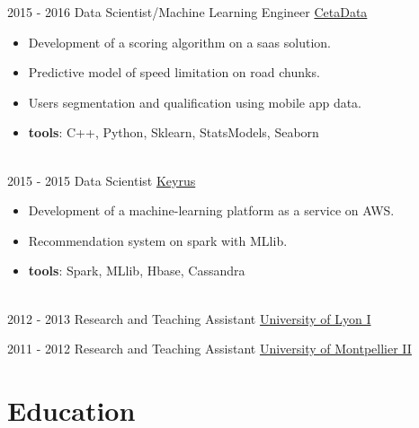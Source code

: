 \documentclass[letterpaper]{twentysecondcv} %
\begin{document}
\begin{twenty}
    \twentyitem
   		{2015 - 2016}
		{}
        {Data Scientist/Machine Learning Engineer}
        {\href{http://www.cetadata.com/}{CetaData}}
        {}
        {\vspace{-2mm}\begin{itemize}[topsep=0pt,partopsep=0pt]
				\item Development of a scoring algorithm on a saas solution.
        \item Predictive model of speed limitation on road chunks.
				\item Users segmentation and qualification using mobile app data.
				\item \textbf{tools}: C++, Python, Sklearn, StatsModels, Seaborn
    \end{itemize}} \\
		
     \twentyitem
   		{2015 - 2015}
		{}
        {Data Scientist}
        {\href{http://www.keyrus.com/}{Keyrus}}
        {}
        {
        \vspace{-2mm}\begin{itemize}[topsep=0pt,partopsep=0pt]
        \item Development of a machine-learning platform as a service on AWS. 
				\item Recommendation system on spark with MLlib.
				\item \textbf{tools}: Spark, MLlib, Hbase, Cassandra
    \end{itemize} } \\
		
	\twentyitem
   		{2012 - 2013}
		{}
        {Research and Teaching Assistant}
        {\href{http://www.univ-lyon1.fr/}{University of Lyon I}}
        {}
        {} 
				
	\twentyitem
   		{2011 - 2012}
		{}
        {Research and Teaching Assistant}
        {\href{http://www.umontpellier.fr/}{University of Montpellier II}}
        {}
        {} 
        
\end{twenty}

\vspace{-0.25cm}
\section{Education}{\faGraduationCap}
\end{document}
